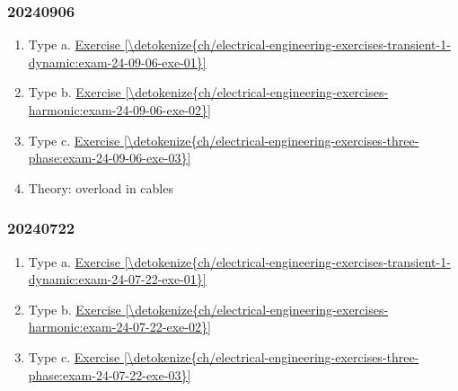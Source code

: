 \documentclass[letterpaper,10pt,italian]{jupyterBook}
\begin{document}
\subsubsection*{2024\sphinxhyphen{}09\sphinxhyphen{}06}
\begin{enumerate}
%
\item {} 
\sphinxAtStartPar
Type a. \hyperref[\detokenize{ch/electrical-engineering-exercises-transient-1-dynamic:exam-24-09-06-exe-01}]{Exercise \ref{\detokenize{ch/electrical-engineering-exercises-transient-1-dynamic:exam-24-09-06-exe-01}}}

\item {} 
\sphinxAtStartPar
Type b. \hyperref[\detokenize{ch/electrical-engineering-exercises-harmonic:exam-24-09-06-exe-02}]{Exercise \ref{\detokenize{ch/electrical-engineering-exercises-harmonic:exam-24-09-06-exe-02}}}

\item {} 
\sphinxAtStartPar
Type c. \hyperref[\detokenize{ch/electrical-engineering-exercises-three-phase:exam-24-09-06-exe-03}]{Exercise \ref{\detokenize{ch/electrical-engineering-exercises-three-phase:exam-24-09-06-exe-03}}}

\item {} 
\sphinxAtStartPar
Theory: overload in cables

\end{enumerate}
\subsubsection*{2024\sphinxhyphen{}07\sphinxhyphen{}22}
\begin{enumerate}
%
\item {} 
\sphinxAtStartPar
Type a. \hyperref[\detokenize{ch/electrical-engineering-exercises-transient-1-dynamic:exam-24-07-22-exe-01}]{Exercise \ref{\detokenize{ch/electrical-engineering-exercises-transient-1-dynamic:exam-24-07-22-exe-01}}}

\item {} 
\sphinxAtStartPar
Type b. \hyperref[\detokenize{ch/electrical-engineering-exercises-harmonic:exam-24-07-22-exe-02}]{Exercise \ref{\detokenize{ch/electrical-engineering-exercises-harmonic:exam-24-07-22-exe-02}}}

\item {} 
\sphinxAtStartPar
Type c. \hyperref[\detokenize{ch/electrical-engineering-exercises-three-phase:exam-24-07-22-exe-03}]{Exercise \ref{\detokenize{ch/electrical-engineering-exercises-three-phase:exam-24-07-22-exe-03}}}

\end{enumerate}
\end{document}

